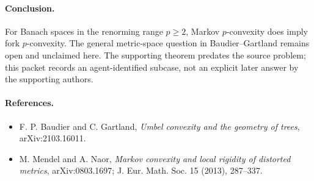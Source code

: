 \documentclass[11pt]{article}
\begin{document}
\paragraph{Conclusion.}
For Banach spaces in the renorming range \(p\ge 2\), Markov \(p\)-convexity
does imply fork \(p\)-convexity. The general metric-space question in
Baudier--Gartland remains open and unclaimed here. The supporting theorem
predates the source problem; this packet records an agent-identified subcase,
not an explicit later answer by the supporting authors.

\paragraph{References.}
\begin{itemize}
\item F. P. Baudier and C. Gartland, \emph{Umbel convexity and the geometry of
trees}, arXiv:2103.16011.
\item M. Mendel and A. Naor, \emph{Markov convexity and local rigidity of
distorted metrics}, arXiv:0803.1697; J. Eur. Math. Soc. 15 (2013), 287--337.
\end{itemize}
\end{document}
